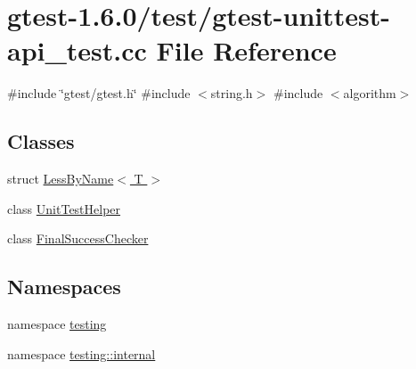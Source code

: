\hypertarget{gtest-unittest-api__test_8cc}{\section{gtest-\/1.6.0/test/gtest-\/unittest-\/api\-\_\-test.cc \-File \-Reference}
\label{d0/da7/gtest-unittest-api__test_8cc}
}
{\ttfamily \#include \char`\"{}gtest/gtest.\-h\char`\"{}}\*
{\ttfamily \#include $<$string.\-h$>$}\*
{\ttfamily \#include $<$algorithm$>$}\*
\subsection*{\-Classes}
\begin{DoxyCompactItemize}
\item 
struct \hyperlink{structtesting_1_1internal_1_1LessByName}{\-Less\-By\-Name$<$ T $>$}
\item 
class \hyperlink{classtesting_1_1internal_1_1UnitTestHelper}{\-Unit\-Test\-Helper}
\item 
class \hyperlink{classtesting_1_1internal_1_1FinalSuccessChecker}{\-Final\-Success\-Checker}
\end{DoxyCompactItemize}
\subsection*{\-Namespaces}
\begin{DoxyCompactItemize}
\item 
namespace \hyperlink{namespacetesting}{testing}
\item 
namespace \hyperlink{namespacetesting_1_1internal}{testing\-::internal}
\end{DoxyCompactItemize}
